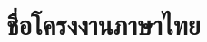 \documentclass{rmutt-project-thai}
\title{ชื่อโครงงานภาษาไทย}
\begin{document}
\makecover



\printtocs
\contentspages




\printref

\end{document}
